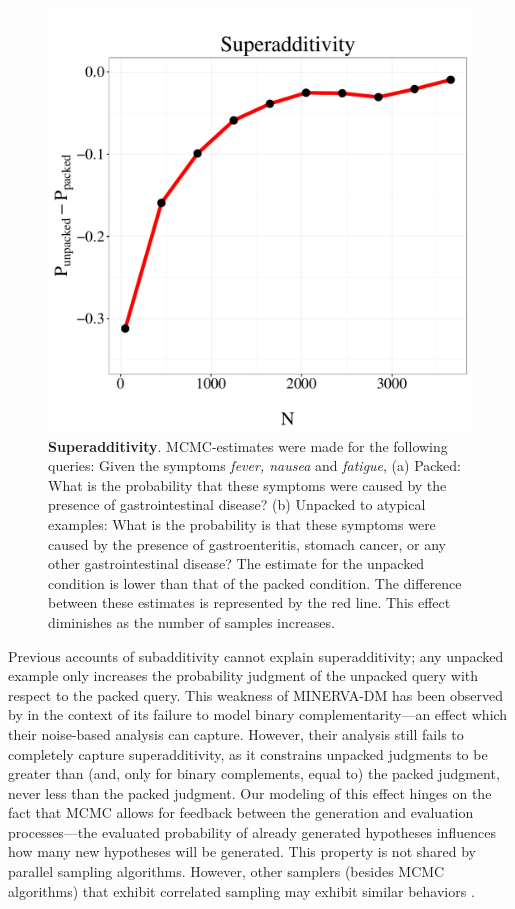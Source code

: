\begin{figure}
\centering
\includegraphics[scale = 0.5]{figures/super.pdf}
\caption{\textbf{Superadditivity}. MCMC-estimates were made for the following queries: Given the symptoms \emph{fever, nausea} and \emph{fatigue}, (a) Packed: What is the probability that these symptoms were caused by the presence of gastrointestinal disease? (b) Unpacked to atypical examples: What is the probability is that these symptoms were caused by the presence of gastroenteritis, stomach cancer, or any other gastrointestinal disease? The estimate for the unpacked condition is lower than that of the packed condition. The difference between these estimates is represented by the red line. This effect diminishes as the number of samples increases.}
\label{fig:superadd}
\end{figure}

Previous accounts of subadditivity \citep[e.g.,][]{Thomas2008, MINERVAsub} cannot explain superadditivity; any unpacked example only increases the probability judgment of the unpacked query with respect to the packed query. This weakness of MINERVA-DM has been observed by \cite{Costello2014} in the context of its failure to model binary complementarity---an effect which their noise-based analysis can capture. However, their analysis still fails to completely capture superadditivity, as it constrains unpacked judgments to be greater than (and, only for binary complements, equal to) the packed judgment, never less than the packed judgment. 
Our modeling of this effect hinges on the fact that MCMC allows for feedback between the generation and evaluation processes---the evaluated probability of already generated hypotheses influences how many new hypotheses will be generated. This property is not shared by  parallel sampling algorithms. However, other samplers (besides MCMC algorithms) that exhibit correlated sampling may exhibit similar behaviors \citep[see for example][]{Bonawitz2014}.

